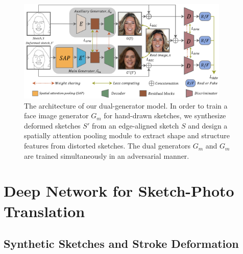 


\begin{figure}[tb]
	\includegraphics[width=0.9\textwidth]{figs/architecture}
	\caption{The architecture of our dual-generator model. In order to train a face image generator $G_m$ for hand-drawn sketches, we synthesize deformed sketches $S'$ from an edge-aligned sketch $S$ and design a spatially attention pooling module to extract shape and structure features from distorted sketches. The dual generators $G_m$ and $G_m$ are trained simultaneously in an adversarial manner. }
	\label{fig:architecture}
\end{figure}
%

\section{Deep Network for Sketch-Photo Translation}
\label{sec:network}

%



\subsection{Synthetic Sketches and Stroke Deformation}
\label{subsec:algorithm_data}



